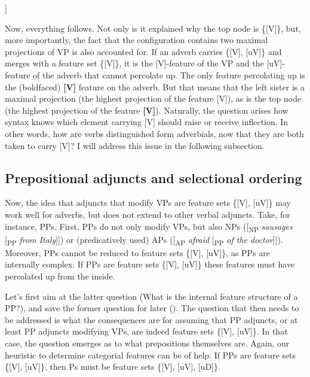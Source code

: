 \documentclass[output=paper
,modfonts
,nonflat]{langsci/langscibook}
\begin{document}
	\begin{exe}
\ex \begin{forest}	
				[\{{[}{V}{]}\}
				[\{{[}V{]}\}]
				[\{{[}{V}{]}{,} {[}uV{]}\}] ]
		\end{forest}
	\end{exe}
\noindent Now, everything follows. Not only is it explained why the top node is \{[V]\}, but, more importantly, the fact that the configuration contains two maximal projections of VP is also accounted for. If an adverb carries \{[V], [uV]\} and merges with a feature set \{[V]\}, it is the [V]-feature of the VP and the [uV]-feature of the adverb that cannot percolate up. The only feature percolating up is the (boldfaced) \textbf{[V]} feature on the adverb. But that means that the left sister is a maximal projection (the highest projection of the feature [V]), as is the top node (the highest projection of the feature \textbf{[V]}). Naturally, the question arises how syntax knows which element carrying [V] should raise or receive inflection. In other words, how are verbs distinguished form adverbials, now that they are both taken to carry [V]? I will address this issue in the following subsection.

\subsection{Prepositional adjuncts and selectional ordering} \label{sec-zeijlstra:3.3}
Now, the idea that adjuncts that modify VPs are feature sets \{[V], [uV]\} may work well for adverbs, but does not extend to other verbal adjuncts. Take, for instance, PPs. First, PPs do not only modify VPs, but also NPs ([\textsubscript{NP} \textit{sausages} [\textsubscript{PP} \textit{from Italy}]]) or (predicatively used) APs ([\textsubscript{AP} \textit{afraid} [\textsubscript{PP} \textit{of the doctor}]]). Moreover, PPs cannot be reduced to feature sets \{[V], [uV]\}, as PPs are internally complex. If PPs are feature sets \{[V], [uV]\} these features must have percolated up from the inside.

Let’s first aim at the latter question (What is the internal feature structure of a PP?), and save the former question for later (). The question that then needs to be addressed is what the consequences are for assuming that PP adjuncts, or at least PP adjuncts modifying VPs, are indeed feature sets \{[V], [uV]\}. In that case, the question emerges as to what prepositions themselves are. Again, our heuristic to determine categorial features can be of help. If PPs are feature sets \{[V], [uV]\}, then Ps must be feature sets \{[V], [uV], [uD]\}.
\end{document}
